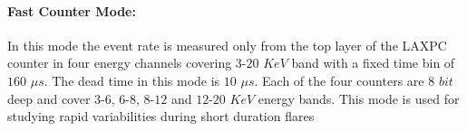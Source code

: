 \documentclass[a4paper,twoside]{report}
\numberwithin{equation}{section}
\begin{document}
\paragraph{Fast Counter Mode:}
In this mode the event rate is measured only from the top layer of the LAXPC counter in four energy channels covering $3$-$20$ $KeV$ band with a fixed time bin of $160$ $\mu s$. The dead time in this mode is $10$ $\mu s$. Each of the four counters are $8$ $bit$ deep and cover $3$-$6$, $6$-$8$, $8$-$12$ and $12$-$20$ $KeV$ energy bands. This mode is used for studying rapid variabilities during short duration flares 
\end{document}
